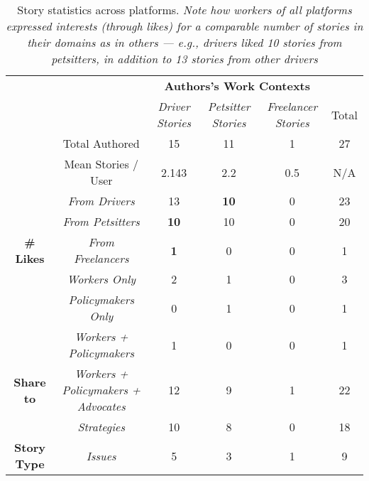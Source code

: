 \begin{table}[h!]
\centering
\resizebox{\textwidth}{!} {
\begin{tabular}{cc|ccc|c}
\cline{3-5}
 &  & \multicolumn{3}{c|}{\textbf{Authors's Work Contexts}} &  \\ \cline{3-6} 
 &  & \multicolumn{1}{c|}{\textit{Driver Stories}} & \multicolumn{1}{c|}{\textit{Petsitter Stories}} & \textit{Freelancer Stories} & Total \\ \cline{2-6} 
\multicolumn{1}{c|}{} & Total Authored & \multicolumn{1}{c|}{15} & \multicolumn{1}{c|}{11} & 1 & 27 \\ \cline{2-6} 
\multicolumn{1}{c|}{} & Mean Stories / User & \multicolumn{1}{c|}{2.143} & \multicolumn{1}{c|}{2.2} & 0.5 & N/A \\ \hline
\multicolumn{1}{|c|}{} & \textit{From Drivers} & \multicolumn{1}{c|}{13} & \multicolumn{1}{c|}{\textbf{10}} & 0 & 23 \\ \cline{2-6} 
\multicolumn{1}{|c|}{} & \textit{From Petsitters} & \multicolumn{1}{c|}{\textbf{10}} & \multicolumn{1}{c|}{10} & 0 & 20 \\ \cline{2-6} 
\multicolumn{1}{|c|}{\multirow{-3}{*}{\textbf{\# Likes}}} & \textit{From Freelancers} & \multicolumn{1}{c|}{\textbf{1}} & \multicolumn{1}{c|}{0} & 0 & 1 \\ \hline
\multicolumn{1}{|c|}{} & \textit{Workers Only} & \multicolumn{1}{c|}{2} & \multicolumn{1}{c|}{1} & 0 & 3 \\ \cline{2-6} 
\multicolumn{1}{|c|}{} & \textit{Policymakers Only} & \multicolumn{1}{c|}{0} & \multicolumn{1}{c|}{1} & 0 & 1 \\ \cline{2-6} 
\multicolumn{1}{|c|}{} & \textit{Workers + Policymakers} & \multicolumn{1}{c|}{1} & \multicolumn{1}{c|}{0} & 0 & 1 \\ \cline{2-6} 
\multicolumn{1}{|c|}{\multirow{-4}{*}{\textbf{Share to}}} & \textit{Workers + Policymakers + Advocates} & \multicolumn{1}{c|}{12} & \multicolumn{1}{c|}{9} & 1 & 22 \\ \hline
\multicolumn{1}{|c|}{} & \textit{Strategies} & \multicolumn{1}{c|}{10} & \multicolumn{1}{c|}{8} & 0 & 18 \\ \cline{2-6} 
\multicolumn{1}{|c|}{\multirow{-2}{*}{\textbf{Story Type}}} & \textit{Issues} & \multicolumn{1}{c|}{5} & \multicolumn{1}{c|}{3} & 1 & 9 \\ \hline
\end{tabular}
}
\caption{{Story statistics across platforms. 
\textit{Note how workers of all platforms expressed interests (through likes) for a comparable number of stories in their domains as in others --- e.g., drivers liked 10 stories from petsitters, in addition to 13 stories from other drivers}}}
\label{story_stats}
\end{table}
